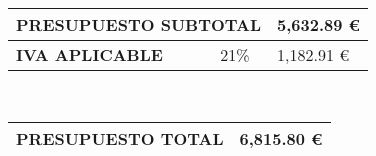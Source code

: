 \vspace{1cm}

\ \hfill
\begin{tabular}{ |p{4cm}|p{2cm}|p{2cm}|  }
	\hline
	\multicolumn{2}{|l|}{\textbf{PRESUPUESTO SUBTOTAL}} & \hfill 5,632.89 \euro \\
	\hline
	\textbf{IVA APLICABLE} & 21\% & \hfill 1,182.91 \euro \\
	\hline
\end{tabular}

\vspace{1cm}

\ \hfill
\begin{tabular}{ |p{5cm}|p{2cm}|}
	\hline
	\textbf{PRESUPUESTO TOTAL} & \hfill 6,815.80 \euro \\
	\hline
\end{tabular}
